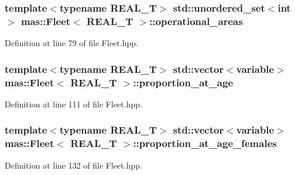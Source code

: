 \hypertarget{structmas_1_1_fleet_aaa8ca2ea30b1afee976199eaabd6caa0}{
\subsubsection[{operational\-\_\-areas}]{\setlength{\rightskip}{0pt plus 5cm}template$<$typename R\-E\-A\-L\-\_\-\-T$>$ std\-::unordered\-\_\-set$<$int$>$ {\bf mas\-::\-Fleet}$<$ R\-E\-A\-L\-\_\-\-T $>$\-::operational\-\_\-areas}}\label{structmas_1_1_fleet_aaa8ca2ea30b1afee976199eaabd6caa0}


Definition at line 79 of file Fleet.\-hpp.

\hypertarget{structmas_1_1_fleet_a19e63403b6cc924ffbbf4876fdeb1cd0}{
\subsubsection[{proportion\-\_\-at\-\_\-age}]{\setlength{\rightskip}{0pt plus 5cm}template$<$typename R\-E\-A\-L\-\_\-\-T$>$ std\-::vector$<${\bf variable}$>$ {\bf mas\-::\-Fleet}$<$ R\-E\-A\-L\-\_\-\-T $>$\-::proportion\-\_\-at\-\_\-age}}\label{structmas_1_1_fleet_a19e63403b6cc924ffbbf4876fdeb1cd0}


Definition at line 111 of file Fleet.\-hpp.

\hypertarget{structmas_1_1_fleet_a8d2308d55f6d12305f288caefe6cac1a}{
\subsubsection[{proportion\-\_\-at\-\_\-age\-\_\-females}]{\setlength{\rightskip}{0pt plus 5cm}template$<$typename R\-E\-A\-L\-\_\-\-T$>$ std\-::vector$<${\bf variable}$>$ {\bf mas\-::\-Fleet}$<$ R\-E\-A\-L\-\_\-\-T $>$\-::proportion\-\_\-at\-\_\-age\-\_\-females}}\label{structmas_1_1_fleet_a8d2308d55f6d12305f288caefe6cac1a}


Definition at line 132 of file Fleet.\-hpp.


